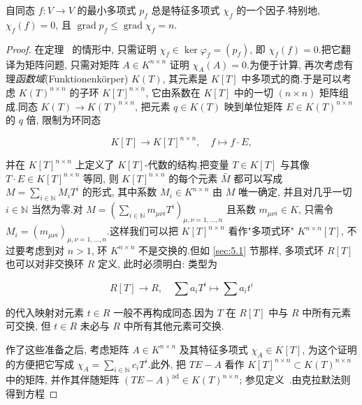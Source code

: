 \begin{theorem}[凯莱--哈密顿]\label{thm:6.2.11}
自同态 $f \colon V \longrightarrow V$ 的最小多项式 $p_f$ 总是特征多项式 $\chi_f$ 的一个因子.特别地, $\chi_f(f) = 0$, 且 $\operatorname{grad} p_f \leq \operatorname{grad} \chi_f = n$.
\end{theorem}

\begin{proof}
在定理~ 的情形中, 只需证明 $\chi_f \in \ker \varphi_f = (p_f)$, 即 $\chi_f(f) = 0$.把它翻译为矩阵问题, 只需对矩阵 $A \in K^{n \times n}$ 证明 $\chi_A(A) = 0$.为便于计算, 再次考虑有理\emph{函数域}(\textup{Funktionenkörper}) $K(T)$, 其元素是 $K[T]$ 中多项式的商.于是可以考虑 $K(T)^{n \times n}$ 的子环 $K[T]^{n \times n}$, 它由系数在 $K[T]$ 中的一切 $(n \times n)$ 矩阵组成.同态 $K(T) \longrightarrow K(T)^{n \times n}$, 把元素 $q \in K(T)$ 映到单位矩阵 $E \in K(T)^{n \times n}$ 的 $q$ 倍, 限制为环同态

\[
K[T] \longrightarrow K[T]^{n \times n}, \quad f \longmapsto f \cdot E,\]

并在 $K[T]^{n \times n}$ 上定义了 $K[T]$-代数的结构.把变量 $T \in K[T]$ 与其像 $T \cdot E \in K[T]^{n \times n}$ 等同, 则 $K[T]^{n \times n}$ 的每个元素 $\bar{M}$ 都可以写成 $M = \sum_{i \in \mathbb{N}} M_i T^i$ 的形式, 其中系数 $M_i \in K^{n \times n}$ 由 $M$ 唯一确定, 并且对几乎一切 $i \in \mathbb{N}$ 当然为零.对 $M = (\sum_{i \in \mathbb{N}} m_{\mu \nu i} T^i)_{\mu, \nu = 1, \ldots, n}$ 且系数 $m_{\mu \nu i} \in K$, 只需令 $M_i = (m_{\mu \nu i})_{\mu, \nu = 1, \ldots, n}$.这样我们可以把 $K[T]^{n \times n}$ 看作"多项式环" $K^{n \times n}[T]$, 不过要考虑到对 $n > 1$, 环 $K^{n \times n}$ 不是交换的.但如 \ref{sec:5.1} 节那样, 多项式环 $R[T]$ 也可以对非交换环 $R$ 定义, 此时必须明白: 类型为

\[
R[T] \longrightarrow R, \quad \sum a_i T^i \longmapsto \sum a_i t^i\]

的代入映射对元素 $t \in R$ 一般不再构成同态.因为 $T$ 在 $R[T]$ 中与 $R$ 中所有元素可交换, 但 $t \in R$ 未必与 $R$ 中所有其他元素可交换.

作了这些准备之后, 考虑矩阵 $A \in K^{n \times n}$ 及其特征多项式 $\chi_A \in K[T]$, 为这个证明的方便把它写成 $\chi_A = \sum_{i \in \mathbb{N}} c_i T^i$.此外, 把 $TE - A$ 看作 $K[T]^{n \times n} \subset K(T)^{n \times n}$ 中的矩阵, 并作其伴随矩阵 $(TE - A)^{\mathrm{ad}} \in K(T)^{n \times n}$; 参见定义~.由克拉默法则~ 得到方程


\end{proof}
